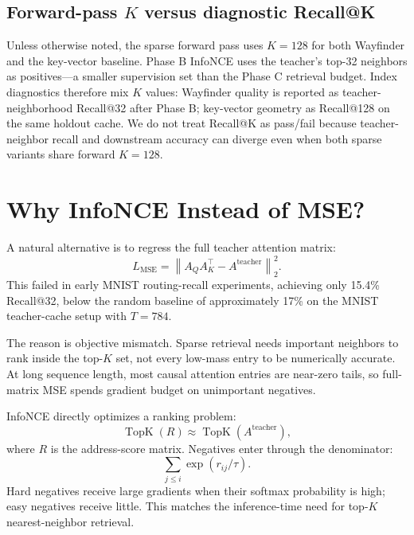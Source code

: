 \documentclass{article}
\newcommand{\topk}{\operatorname{TopK}}
\begin{document}
\subsection{Forward-pass $K$ versus diagnostic Recall@K}

Unless otherwise noted, the sparse forward pass uses $K=128$ for both Wayfinder and the key-vector baseline. Phase B InfoNCE uses the teacher's top-32 neighbors as positives---a smaller supervision set than the Phase C retrieval budget. Index diagnostics therefore mix $K$ values: Wayfinder quality is reported as teacher-neighborhood Recall@32 after Phase B; key-vector geometry as Recall@128 on the same holdout cache. We do not treat Recall@K as pass/fail because teacher-neighbor recall and downstream accuracy can diverge even when both sparse variants share forward $K=128$.

\section{Why InfoNCE Instead of MSE?}

A natural alternative is to regress the full teacher attention matrix:
\begin{equation}
L_{\mathrm{MSE}}
=
\left\|
A_Q A_K^\top - A^{\mathrm{teacher}}
\right\|_2^2 .
\end{equation}
This failed in early MNIST routing-recall experiments, achieving only 15.4\% Recall@32, below the random baseline of approximately 17\% on the MNIST teacher-cache setup with $T=784$.

The reason is objective mismatch. Sparse retrieval needs important neighbors to rank inside the top-$K$ set, not every low-mass entry to be numerically accurate. At long sequence length, most causal attention entries are near-zero tails, so full-matrix MSE spends gradient budget on unimportant negatives.

InfoNCE directly optimizes a ranking problem:
\begin{equation}
\topk(R)
\approx
\topk(A^{\mathrm{teacher}}),
\end{equation}
where $R$ is the address-score matrix. Negatives enter through the denominator:
\begin{equation}
\sum_{j \le i} \exp(r_{ij}/\tau).
\end{equation}
Hard negatives receive large gradients when their softmax probability is high; easy negatives receive little. This matches the inference-time need for top-$K$ nearest-neighbor retrieval.
\end{document}
